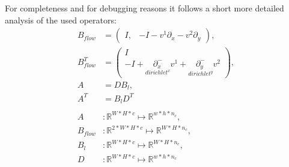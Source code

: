 \documentclass[A4,12pt]{article}
\DeclareMathOperator*{\argmin}{arg\,min}
\newcommand{\R}{\mathbb{R}}
\newcommand{\norm}[1]{\Vert #1 \Vert}
\begin{document}
\\\\
For completeness and for debugging reasons it follows a short more detailed analysis of the used operators:
\begin{equation}
\begin{aligned}
B_{flow}&=\begin{pmatrix}I, &-I-v^1\partial_x-v^2\partial_y\end{pmatrix}, \\
B_{flow}^T&=\begin{pmatrix}I \\ -I+\underset{dirichlet^x} {\partial^-_x} v^1+\underset{dirichlet^y}{\partial^-_y} v^2\end{pmatrix}, \\
A&=DB_l, \\
A^T&=B_lD^T \\\\
A&\colon\R^{W*H*c}\mapsto\R^{w*h*n_c}, \\
B_{flow}&\colon\R^{2*W*H*c}\mapsto\R^{W*H*n_c}, \\
B_l&\colon\R^{W*H*c}\mapsto\R^{W*H*n_c}, \\
D&\colon\R^{W*H*c}\mapsto\R^{w*h*n_c} \\
\end{aligned}
\end{equation}



\end{document}
